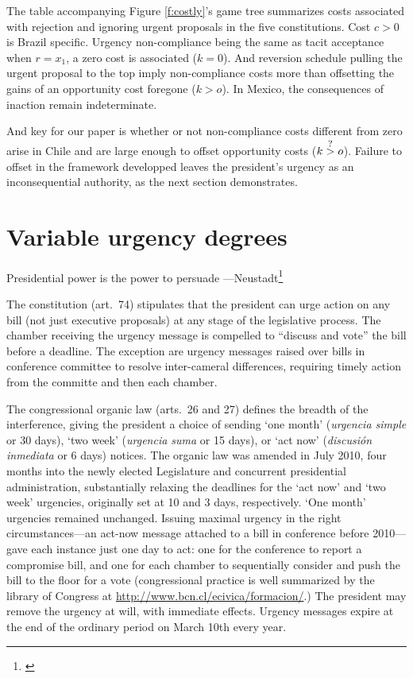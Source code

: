 \documentclass[letter,12pt]{article}
\begin{document}
The table accompanying Figure \ref{f:costly}'s game tree summarizes costs associated with rejection and ignoring urgent proposals in the five constitutions. Cost $c>0$ is Brazil specific. Urgency non-compliance being the same as tacit acceptance when $r=x_1$, a zero cost is associated ($k=0$). And reversion schedule pulling the urgent proposal to the top imply non-compliance costs more than offsetting the gains of an opportunity cost foregone ($k>o$). In Mexico, the consequences of inaction remain indeterminate. 

\newcommand\mygt{\mathrel{\stackrel{\makebox[0pt]{\mbox{\normalfont\footnotesize ?}}}{>}}} %

And key for our paper is whether or not non-compliance costs different from zero arise in Chile and are large enough to offset opportunity costs ($k \mygt o$). Failure to offset in the framework developped leaves the president's urgency as an inconsequential authority, as the next section demonstrates. %

\section{Variable urgency degrees}
\begin{center}
Presidential power is the power to persuade ---Neustadt\footnote{\citet[][11]{neustadt.1990}}
\end{center}

The constitution (art.\ 74) stipulates that the president can urge action on any bill (not just executive proposals) at any stage of the legislative process. The chamber receiving the urgency message is compelled to ``discuss and vote'' the bill before a deadline. The exception are urgency messages raised over bills in conference committee to resolve inter-cameral differences, requiring timely action from the committe and then each chamber.

The congressional organic law (arts.\ 26 and 27) defines the breadth of the interference, giving the president a choice of sending `one month' (\emph{urgencia simple} or 30 days), `two week' (\emph{urgencia suma} or 15 days), or `act now' (\emph{discusión inmediata} or 6 days) notices. The organic law was amended in July 2010, four months into the newly elected Legislature and concurrent presidential administration, substantially relaxing the deadlines for the `act now' and `two week' urgencies, originally set at 10 and 3 days, respectively. `One month' urgencies remained unchanged. Issuing maximal urgency in the right circumstances---an act-now message attached to a bill in conference before 2010---gave each instance just one day to act: one for the conference to report a compromise bill, and one for each chamber to sequentially consider and push the bill to the floor for a vote (congressional practice is well summarized by the library of Congress at \url{http://www.bcn.cl/ecivica/formacion/}.) The president may remove the urgency at will, with immediate effects. Urgency messages expire at the end of the ordinary period on March 10th every year. 
\end{document}
